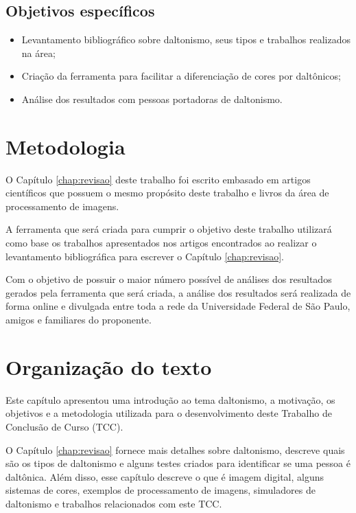 \documentclass[	12pt, Times, openright, twoside, a4paper, english, brazil]{abntex2}
\begin{document}
\subsection{Objetivos específicos}

\begin{itemize}
\item Levantamento bibliográfico sobre daltonismo, seus tipos e trabalhos realizados na área;
\item Criação da ferramenta para facilitar a diferenciação de cores por daltônicos;
\item Análise dos resultados com pessoas portadoras de daltonismo.
\end{itemize}

\section{Metodologia}

O Capítulo \ref{chap:revisao} deste trabalho foi escrito embasado em artigos científicos que possuem o mesmo propósito deste trabalho e livros da área de processamento de imagens.

A ferramenta que será criada para cumprir o objetivo deste trabalho utilizará como base os trabalhos apresentados nos artigos encontrados ao realizar o levantamento bibliográfica para escrever o Capítulo \ref{chap:revisao}.

Com o objetivo de possuir o maior número possível de análises dos resultados gerados pela ferramenta que será criada, a análise dos resultados será realizada de forma online e divulgada entre toda a rede da Universidade Federal de São Paulo, amigos e familiares do proponente.

\section{Organização do texto}

Este capítulo apresentou uma introdução ao tema daltonismo, a motivação, os objetivos e a metodologia utilizada para o desenvolvimento deste Trabalho de Conclusão de Curso (TCC).

O Capítulo \ref{chap:revisao} fornece mais detalhes sobre daltonismo, descreve quais são os tipos de daltonismo e alguns testes criados para identificar se uma pessoa é daltônica. Além disso, esse capítulo descreve o que é imagem digital, alguns sistemas de cores, exemplos de processamento de imagens, simuladores de daltonismo e trabalhos relacionados com este TCC.
\end{document}
